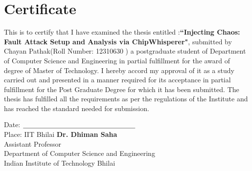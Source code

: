 \chapter{Certificate}
\begin{Spacing}{1}
\sffamily
This is to certify that I have examined the thesis entitled :\textbf{``Injecting Chaos: Fault Attack Setup and Analysis via ChipWhisperer"}, submitted by 
Chayan Pathak(Roll Number: 12310630 ) a postgraduate student of Department of Computer Science and Engineering in partial fulfillment for the award of degree of Master of Technology. I hereby accord my approval of it as a study carried out and presented in a manner required for its acceptance in partial fulfillment for the Post Graduate Degree for which it has been
submitted. The thesis has fulfilled all the requirements as per the regulations of the Institute and has reached the standard needed for submission.

\end{Spacing}




\vspace{2cm}



\noindent
Date: \hspace{0pt plus 1filll} $\underline{\hspace{5.8cm}}$\\
Place: IIT Bhilai \hspace{0pt plus 1filll} \textbf{Dr. Dhiman Saha}\\
\hspace*{0pt plus 1filll} Assistant Professor\\
\hspace*{0pt plus 1filll} Department of Computer Science and Engineering\\
\hspace*{0pt plus 1filll} Indian Institute of Technology Bhilai


